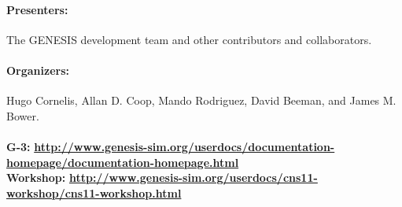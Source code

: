 \documentclass[12pt]{article}
\begin{document}








\paragraph*{Presenters:}
The GENESIS development team and other contributors and collaborators.

\paragraph*{Organizers:}
Hugo Cornelis, Allan D. Coop, Mando Rodriguez, David Beeman, and James M. Bower. \\

 \\
{\bf G-3:} {\scriptsize \href{http://www.genesis-sim.org/userdocs/documentation-homepage/documentation-homepage.html}{\bf http://www.genesis-sim.org/userdocs/documentation-homepage/documentation-homepage.html}} \\
{\bf Workshop:} {\scriptsize \href{http://www.genesis-sim.org/userdocs/cns11-workshop/cns11-workshop.html}{\bf http://www.genesis-sim.org/userdocs/cns11-workshop/cns11-workshop.html}}
\end{document}
